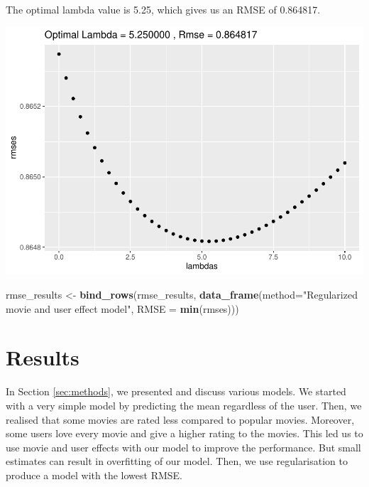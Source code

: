 \documentclass[]{article}
\newenvironment{Shaded}{\begin{snugshade}}{\end{snugshade}}
\newcommand{\DataTypeTok}[1]{\textcolor[rgb]{0.13,0.29,0.53}{#1}}
\newcommand{\KeywordTok}[1]{\textcolor[rgb]{0.13,0.29,0.53}{\textbf{#1}}}
\newcommand{\NormalTok}[1]{#1}
\newcommand{\OperatorTok}[1]{\textcolor[rgb]{0.81,0.36,0.00}{\textbf{#1}}}
\newcommand{\StringTok}[1]{\textcolor[rgb]{0.31,0.60,0.02}{#1}}
\begin{document}
The optimal lambda value is 5.25, which gives us an RMSE of 0.864817.

\begin{Shaded}
\end{Shaded}

\includegraphics{Project_MovieLens_files/figure-latex/unnamed-chunk-29-1.pdf}

\begin{Shaded}
\begin{Highlighting}[]
\NormalTok{rmse_results <-}\StringTok{ }\KeywordTok{bind_rows}\NormalTok{(rmse_results,}
                          \KeywordTok{data_frame}\NormalTok{(}\DataTypeTok{method=}\StringTok{"Regularized movie and user effect model"}\NormalTok{,  }
                                     \DataTypeTok{RMSE =} \KeywordTok{min}\NormalTok{(rmses)))}
\end{Highlighting}
\end{Shaded}

\section{Results}
\label{sec:results}

In Section \ref{sec:methods}, we presented and discuss various models.
We started with a very simple model by predicting the mean regardless of
the user. Then, we realised that some movies are rated less compared to
popular movies. Moreover, some users love every movie and give a higher
rating to the movies. This led us to use movie and user effects with our
model to improve the performance. But small estimates can result in
overfitting of our model. Then, we use regularisation to produce a model
with the lowest RMSE.
\end{document}
